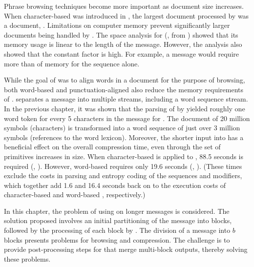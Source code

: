 
Phrase browsing techniques become more
important as document size increases.
When character-based \repair was introduced in 
, the largest document processed by
\repair was a  document, \wsja.  
Limitations on computer memory prevent significantly larger
documents being handled by \repair.
The space analysis for \repair (,
from ) showed that 
its memory usage is linear to the length of the
message.  However, the analysis also showed that the constant 
factor is high.  For example, a  message would 
require more than  of memory for the sequence alone.

While the goal of \prepair was to align words in a document
for the purpose of browsing, both word-based and 
punctuation-aligned \repair also 
reduce the memory requirements of \repair.  \prepair separates
a message into multiple streams, including a word sequence
stream.  In the previous chapter,
it was shown that the parsing of \wsja by \prepair yielded
roughly one word token for every 5 characters in
the message for \repair.
The \wsja document of 20 million symbols
(characters) is transformed into a word sequence of just over
3 million symbols (references to the word lexicon).  Moreover,
the shorter input into \repair has a beneficial effect on the
overall compression time, even through the set of primitives 
increases in size.  
When character-based \repair is applied to \wsja, 
88.5 seconds is required (, 
).  However, word-based
\repair requires only 19.6 seconds 
(, ).
(These times exclude the costs in parsing and entropy 
coding of the sequences and modifiers, which together
add 1.6 and 16.4 seconds back on to the execution
costs of character-based and word-based
\repair, respectively.)

In this chapter, the problem of using \repair on longer 
messages is considered.  The solution proposed
involves an initial partitioning of the
message into blocks, followed by the processing of each 
block by \repair.  The division of a message into
$b$ blocks presents problems for
browsing and compression.  
The challenge is to provide
post-processing steps for \repair 
that merge multi-block outputs, thereby solving these problems.

